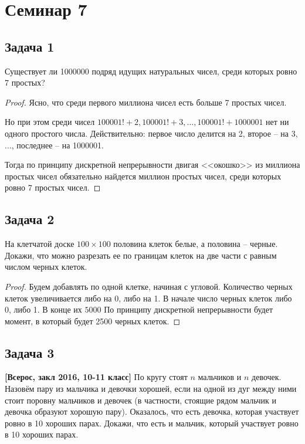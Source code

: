 
\section{Семинар 7}

\subsection{Задача 1}
Существует ли 1000000 подряд идущих натуральных чисел, среди которых ровно 7
простых?

\begin{proof}
Ясно, что среди первого миллиона чисел есть больше 7 простых чисел.

Но при этом среди чисел $100001! + 2, 100001! + 3, \ldots, 100001! + 1000001$ нет ни одного простого числа. Действительно: первое число делится на 2, второе -- на 3, $\ldots$, последнее -- на 1000001.

Тогда по принципу дискретной непрерывности двигая <<окошко>> из миллиона простых чисел обязательно найдется миллион простых чисел, среди которых ровно 7 простых чисел.
\end{proof}

\subsection{Задача 2}
На клетчатой доске $100 \times 100$ половина клеток белые, а половина -- черные. Докажи,
что можно разрезать ее по границам клеток на две части с равным числом черных
клеток.

\begin{proof}
Будем добавлять по одной клетке, начиная с угловой. Количество черных клеток увеличивается либо на 0, либо на 1. В начале число черных клеток либо 0, либо 1. В конце их $5000$ По принципу дискретной непрерывности будет момент, в который будет 2500 черных клеток. 
\end{proof}

\subsection{Задача 3}
\textbf{[Всерос, закл 2016, 10-11 класс]} По кругу стоят $n$ мальчиков и $n$ девочек. Назовём пару из мальчика и девочки хорошей, если на одной из дуг между ними стоит поровну мальчиков и девочек (в частности, стоящие рядом мальчик и девочка образуют хорошую пару). Оказалось, что есть
девочка, которая участвует ровно в 10 хороших парах. Докажи, что есть и мальчик,
который участвует ровно в 10 хороших парах.

